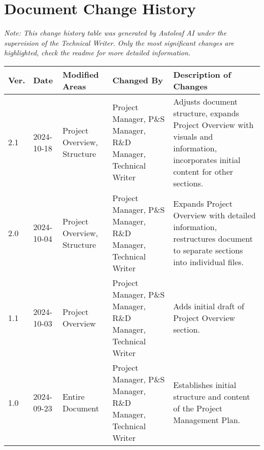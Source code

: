 \section{Document Change History}

\begin{center}
\small\textit{Note: This change history table was generated by Autoleaf AI under the supervision of the Technical Writer. Only the most significant changes are highlighted, check the readme for more detailed information.}

\vspace{0.5cm}

\begin{tabular}{|p{}|p{}|p{}|p{}|p{}|}
\hline
\textbf{Ver.} & \textbf{Date} & \textbf{Modified Areas} & \textbf{Changed By} & \textbf{Description of Changes} \\
\hline
2.1 & 2024-10-18 & Project Overview, Structure & Project Manager, P\&S Manager, R\&D Manager, Technical Writer & Adjusts document structure, expands Project Overview with visuals and information, incorporates initial content for other sections. \\
\hline
2.0 & 2024-10-04 & Project Overview, Structure & Project Manager, P\&S Manager, R\&D Manager, Technical Writer & Expands Project Overview with detailed information, restructures document to separate sections into individual files. \\
\hline
1.1 & 2024-10-03 & Project Overview & Project Manager, P\&S Manager, R\&D Manager, Technical Writer & Adds initial draft of Project Overview section. \\
\hline
1.0 & 2024-09-23 & Entire Document & Project Manager, P\&S Manager, R\&D Manager, Technical Writer & Establishes initial structure and content of the Project Management Plan. \\
\hline
\end{tabular}
\end{center}

\vspace{1cm} 
